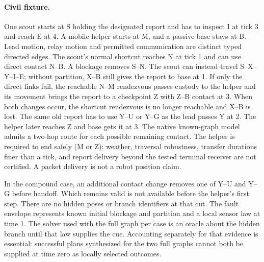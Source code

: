 \documentclass[11pt]{article}
\begin{document}
\paragraph{Civil fixture.}
One scout starts at S holding the designated report and has to
inspect I at tick 3 and reach E at 4. A mobile helper starts at M,
and a passive base stays at B. Lead motion, relay motion and
permitted communication are distinct typed directed edges.
The scout's normal shortcut reaches N at tick 1 and can use direct
contact N--B. A blockage removes S--N. The scout can instead travel
S--X--Y--I--E; without partition, X--B still gives the report to
base at 1. If only the direct links fail, the reachable N--M
rendezvous passes custody to the helper and its movement brings the
report to a checkpoint Z with Z--B contact at 3. When both changes
occur, the shortcut rendezvous is no longer reachable and X--B
is lost. The same old report has to use Y--U or Y--G as the lead
passes Y at 2. The helper later reaches Z and base gets it at 3.
The native known-graph model admits a two-hop route for each possible
remaining contact. The helper is required to end safely (M or Z);
weather, traversal robustness, transfer durations finer than a tick,
and report delivery beyond the tested terminal receiver are not
certified. A packet delivery is not a robot position claim.

In the compound case, an additional contact change removes one
of Y--U and Y--G before handoff. Which remains valid is not
available before the helper's first step. There are no hidden
poses or branch identifiers at that cut. The fault envelope
represents known initial blockage and partition and a local sensor
law at time 1. The solver used with the full graph per case is
an oracle about the hidden branch until that law supplies the cue.
Accounting separately for that evidence is essential: successful
plans synthesized for the two full graphs cannot both be supplied
at time zero as locally selected outcomes.
\end{document}
